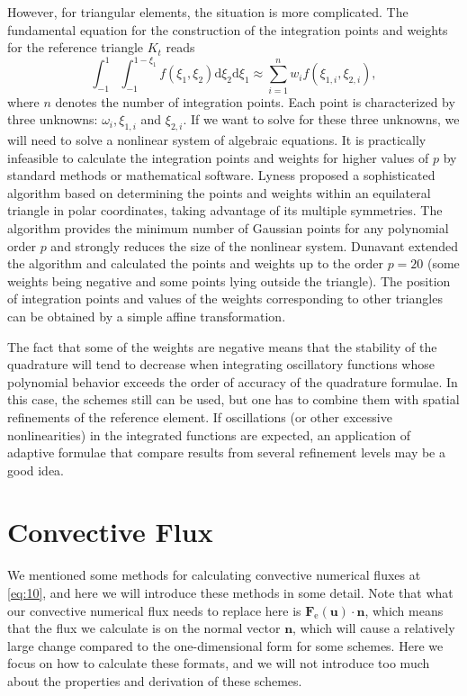 \documentclass{develop-note}
\begin{document}
However, for triangular elements, the situation is more complicated. The fundamental equation for the construction of the integration points and weights for the reference triangle $K_{t}$ reads
\begin{equation}
  \int_{-1}^{1}\int_{-1}^{1-\xi_{1}}f(\xi_{1},\xi_{2})\mathrm{d}\xi_{2}\mathrm{d}\xi_{1}\approx\sum_{i=1}^{n}w_{i}f(\xi_{1,i},\xi_{2,i}),
\end{equation}
where $n$ denotes the number of integration points. Each point is characterized by three unknowns: $\omega_{i},\xi_{1,i}$ and $\xi_{2,i}$. If we want to solve for these three unknowns, we will need to solve a nonlinear system of algebraic equations. It is practically infeasible to calculate the integration points and weights for higher values of $p$ by standard methods or mathematical software. Lyness\cite{lynessModerateDegreeSymmetric1975} proposed a sophisticated algorithm based on determining the points and weights within an equilateral triangle in polar coordinates, taking advantage of its multiple symmetries. The algorithm provides the minimum number of Gaussian points for any polynomial order $p$ and strongly reduces the size of the nonlinear system. Dunavant\cite{dunavantHighDegreeEfficient1985} extended the algorithm and calculated the points and weights up to the order $p=20$ (some weights being negative and some points lying outside the triangle). The position of integration points and values of the weights corresponding to other triangles can be obtained by a simple affine transformation.

The fact that some of the weights are negative means that the stability of the quadrature will tend to decrease when integrating oscillatory functions whose polynomial behavior exceeds the order of accuracy of the quadrature formulae. In this case, the schemes still can be used, but one has to combine them with spatial refinements of the reference element. If oscillations (or other excessive nonlinearities) in the integrated functions are expected, an application of adaptive formulae that compare results from several refinement levels may be a good idea.

\section{Convective Flux}

We mentioned some methods for calculating convective numerical fluxes at \autoref{eq:10}, and here we will introduce these methods in some detail. Note that what our convective numerical flux needs to replace here is $\mathbf{F}_{\mathrm{e}}(\mathbf{u})\cdot\mathbf{n}$, which means that the flux we calculate is on the normal vector $\mathbf{n}$, which will cause a relatively large change compared to the one-dimensional form for some schemes. Here we focus on how to calculate these formats, and we will not introduce too much about the properties and derivation of these schemes.
\end{document}
